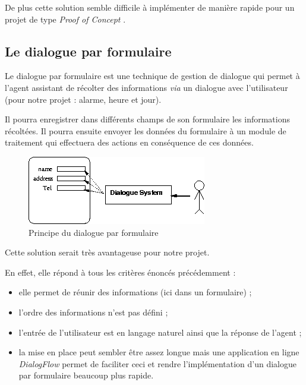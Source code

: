 De plus cette solution semble difficile à implémenter de manière rapide pour un projet de type \og \emph{Proof of Concept} \fg.  

\FloatBarrier

\subsection{Le dialogue par formulaire}
Le dialogue par formulaire est une technique de gestion de dialogue qui permet à l'agent assistant de récolter des informations \emph{via} un dialogue avec l'utilisateur (pour notre projet : alarme, heure et jour). 

Il pourra enregistrer dans différents champs de son formulaire les informations récoltées. Il pourra ensuite envoyer les données du formulaire à un module de traitement qui effectuera des actions en conséquence de ces données.

\begin{figure}[H]
\centering
    \includegraphics[scale=0.7]{images/slot.png} %
    \caption{Principe du dialogue par formulaire}
\end{figure}

Cette solution serait très avantageuse pour notre projet. 

En effet, elle répond à tous les critères énoncés précédemment : 
\begin{itemize}
    \item elle permet de réunir des informations (ici dans un formulaire) ;
    \item l'ordre des informations n'est pas défini ;
    \item l'entrée de l'utilisateur est en langage naturel ainsi que la réponse de l'agent ;
    \item la mise en place peut sembler être assez longue mais une application en ligne \textit{DialogFlow} permet de faciliter ceci et rendre l'implémentation d'un dialogue par formulaire beaucoup plus rapide.
\end{itemize}



